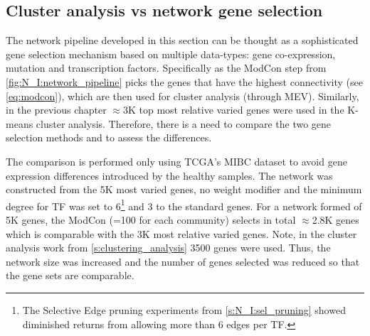 



\subsection{Cluster analysis vs network gene selection} \label{s:N_I:cs_vs_gene_sel}

The network pipeline developed in this section can be thought as a sophisticated gene selection mechanism based on multiple data-types: gene co-expression, mutation and transcription factors. Specifically as the ModCon step from  \cref{fig:N_I:network_pipeline} picks the genes that have the highest connectivity (see \cref{eq:modcon}), which are then used for cluster analysis (through MEV). Similarly, in the previous chapter $\approx$3K top most relative varied genes were used in the K-means cluster analysis. Therefore, there is a need to compare the two gene selection methods and to assess the differences.

The comparison is performed only using TCGA's MIBC dataset to avoid gene expression differences introduced by the healthy samples. The network was constructed from the 5K most varied genes, no weight modifier and the minimum degree for TF  was set to 6\footnote{The Selective Edge pruning experiments from \cref{s:N_I:sel_pruning} showed diminished returns from allowing more than 6 edges per TF.} and 3 to the standard genes. For a network formed of 5K genes, the ModCon (=100 for each community) selects in total $\approx$2.8K genes which is comparable with the 3K most relative varied genes. Note, in the cluster analysis work from \cref{s:clustering_analysis} 3500 genes were used. Thus, the network size was increased and the number of genes selected was reduced so that the gene sets are comparable.

